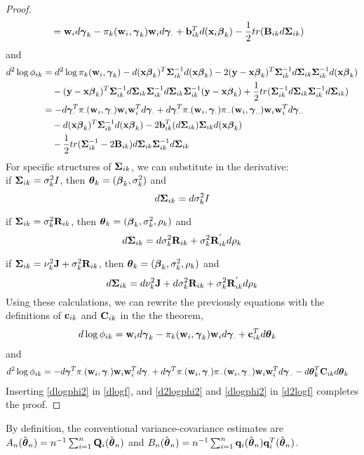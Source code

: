 \begin{proof}
\begin{align*}
&=\mathbf w_{i} d\boldsymbol \gamma_{k} -\pi_{k}(\mathbf w_{i},\boldsymbol\gamma_k)\mathbf w_{i}d\boldsymbol\gamma_{\cdot}+\mathbf b^{T}_{ik}d(\mathbf x_{i}\boldsymbol \beta_{k})-\frac{1}{2}tr(\mathbf B_{ik}d\boldsymbol\Sigma_{ik})
\end{align*}
and
\begin{align*}
d^{2}\log \phi_{ik}&=d^{2}\log \pi_{k}(\mathbf w_{i},\boldsymbol\gamma_k)-d(\mathbf x\boldsymbol \beta_{k})^{T}\boldsymbol\Sigma_{ik}^{-1}d(\mathbf x\boldsymbol \beta_{k})-2(\mathbf y-\mathbf x\boldsymbol \beta_{k})^{T}\boldsymbol\Sigma_{ik}^{-1}d\boldsymbol\Sigma_{ik}\boldsymbol\Sigma_{ik}^{-1}d(\mathbf x\boldsymbol\beta_{k})\\
&\quad-(\mathbf y-\mathbf x\boldsymbol \beta_{k})^{T}\boldsymbol\Sigma_{ik}^{-1}d\boldsymbol\Sigma_{ik}\boldsymbol\Sigma_{ik}^{-1}d\boldsymbol\Sigma_{ik}\boldsymbol\Sigma_{ik}^{-1}(\mathbf y-\mathbf x\boldsymbol\beta_{k})+\frac{1}{2}tr(\boldsymbol\Sigma_{ik}^{-1}d\boldsymbol\Sigma_{ik}\boldsymbol\Sigma_{ik}^{-1}d\boldsymbol\Sigma_{ik})\\
&=-d\boldsymbol\gamma_{\cdot}^{T}\pi_{\cdot}(\mathbf w_{i},\boldsymbol\gamma_{\cdot})\mathbf w_{i}\mathbf w_{i}^{T}d\boldsymbol\gamma_{\cdot}+d\boldsymbol\gamma_{\cdot}^{T}\pi_{\cdot}(\mathbf w_{i},\boldsymbol\gamma_{\cdot})\pi_{\cdot\cdot}(\mathbf w_{i},\boldsymbol\gamma_{\cdot\cdot})\mathbf w_{i}\mathbf w_{i}^{T}d\boldsymbol\gamma_{\cdot\cdot}\\
&\quad-d(\mathbf x\boldsymbol \beta_{k})^{T}\boldsymbol\Sigma_{ik}^{-1}d(\mathbf x\boldsymbol \beta_{k})-2\mathbf b_{ik}^{T}(d\boldsymbol\Sigma_{ik})\boldsymbol\Sigma_{ik}d(\mathbf x\boldsymbol\beta_{k})\\
&\quad-\frac{1}{2}tr(\boldsymbol\Sigma_{ik}^{-1}-2\mathbf B_{ik})d\boldsymbol\Sigma_{ik}\boldsymbol\Sigma_{ik}^{-1}d\boldsymbol\Sigma_{ik}
\end{align*}
For specific structures of $\boldsymbol\Sigma_{ik}$, we can substitute in the derivative:\\

if $\boldsymbol\Sigma_{ik}=\sigma_{k}^{2}I$, then $\boldsymbol\theta_{k}=(\boldsymbol\beta_{k},\sigma^{2}_{k})$ and
$$d\boldsymbol\Sigma_{ik}=d\sigma_{k}^{2}I$$

if $\boldsymbol\Sigma_{ik}=\sigma_{k}^{2}\mathbf R_{ik}$, then $\boldsymbol\theta_{k}=(\boldsymbol\beta_{k},\sigma^{2}_{k},\rho_{k})$ and
$$d\boldsymbol\Sigma_{ik}=d\sigma_{k}^{2}\mathbf R_{ik} +\sigma_{k}^{2}\mathbf R^{'}_{ik}d\rho_{k}$$

if $\boldsymbol\Sigma_{ik}=\nu_{k}^{2}\mathbf J+\sigma_{k}^{2}\mathbf R_{ik}$, then $\boldsymbol\theta_{k}=(\boldsymbol\beta_{k},\sigma^{2}_{k},\rho_{k})$ and
$$d\boldsymbol\Sigma_{ik}=d\nu_{k}^{2}\mathbf J + d\sigma_{k}^{2}\mathbf R_{ik} +\sigma_{k}^{2}\mathbf R^{'}_{ik}d\rho_{k}$$
Using these calculations, we can rewrite the previously equations with the definitions of $\mathbf c_{ik}$ and $\mathbf C_{ik}$ in the the theorem,
\begin{align}\label{dlogphi2}
d\log \phi_{ik}&=\mathbf w_{i} d\boldsymbol \gamma_{k} -\pi_{k}(\mathbf w_{i},\boldsymbol\gamma_k)\mathbf w_{i}d\boldsymbol\gamma_{\cdot}+\mathbf c^{T}_{ik}d\boldsymbol\theta_{k} 
\end{align}
and
\begin{align}\label{d2logphi2}
d^{2}\log \phi_{ik}
&=-d\boldsymbol\gamma_{\cdot}^{T}\pi_{\cdot}(\mathbf w_{i},\boldsymbol\gamma_{\cdot})\mathbf w_{i}\mathbf w_{i}^{T}d\boldsymbol\gamma_{\cdot}+d\boldsymbol\gamma_{\cdot}^{T}\pi_{\cdot}(\mathbf w_{i},\boldsymbol\gamma_{\cdot})\pi_{\cdot\cdot}(\mathbf w_{i},\boldsymbol\gamma_{\cdot\cdot})\mathbf w_{i}\mathbf w_{i}^{T}d\boldsymbol\gamma_{\cdot\cdot}-d\boldsymbol\theta_{k}^{T}\mathbf C_{ik}d\boldsymbol\theta_{k}
\end{align}
Inserting \eqref{dlogphi2} in \eqref{dlogf}, and \eqref{d2logphi2} and \eqref{dlogphi2} in \eqref{d2logf} completes the proof.
\end{proof}
By definition, the conventional variance-covariance estimates are $A_{n}(\hat{\boldsymbol\theta}_{n})=n^{-1}\sum_{i=1}^{n}\mathbf Q_{i}(\hat{\boldsymbol \theta}_{n})$ and $B_{n}(\hat{\boldsymbol\theta}_{n})=n^{-1}\sum_{i=1}^{n}\mathbf q_{i}(\hat{\boldsymbol\theta}_{n})\mathbf q_{i}^{T}(\hat{\boldsymbol\theta}_{n})$. 


